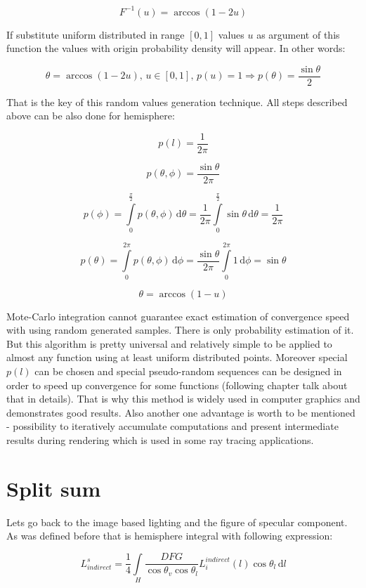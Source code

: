 \[F^{-1}(u) = \arccos(1-2u)\]

If substitute uniform distributed in range $[0, 1]$ values $u$ as argument of this function the values with origin probability density will appear. In other words\+:

\[\theta = \arccos(1 - 2u),\, u \in [0, 1],\, p(u) = 1 \Rightarrow p(\theta) = \frac{\sin\theta}{2}\]

That is the key of this random values generation technique. All steps described above can be also done for hemisphere\+:

\[p(l) = \frac{1}{2\pi}\]

\[p(\theta, \phi) = \frac{\sin\theta}{2\pi}\]

\[p(\phi) = \int\limits_0^\frac{\pi}{2} p(\theta, \phi)\, \mathrm{d}\theta = \frac{1}{2\pi} \int\limits_0^\frac{\pi}{2} \sin\theta\, \mathrm{d}\theta = \frac{1}{2\pi}\]

\[p(\theta) = \int\limits_0^{2\pi} p(\theta, \phi)\, \mathrm{d}\phi = \frac{\sin\theta}{2\pi}\int\limits_0^{2\pi}1\, \mathrm{d}\phi = \sin\theta\]

\[\theta = \arccos(1-u)\]

Mote-\/\+Carlo integration cannot guarantee exact estimation of convergence speed with using random generated samples. There is only probability estimation of it. But this algorithm is pretty universal and relatively simple to be applied to almost any function using at least uniform distributed points. Moreover special $p(l)$ can be chosen and special pseudo-\/random sequences can be designed in order to speed up convergence for some functions (following chapter talk about that in details). That is why this method is widely used in computer graphics and demonstrates good results. Also another one advantage is worth to be mentioned -\/ possibility to iteratively accumulate computations and present intermediate results during rendering which is used in some ray tracing applications.\hypertarget{specification__pbr_math_pbr_split_sum}{}\section{Split sum}\label{specification__pbr_math_pbr_split_sum}
Lets go back to the image based lighting and the figure of specular component. As was defined before that is hemisphere integral with following expression\+:

\[L_{indirect}^s = \frac{1}{4}\int\limits_H \frac{DFG}{\cos\theta_v \cos\theta_l} L_i^{indirect}(l) \cos\theta_l\, \mathrm{d}l\]

